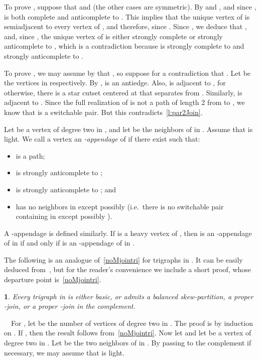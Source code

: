 \documentclass[11 pt] {article}
\newcommand\blackslug{\hbox{\hskip 1pt \vrule width 4pt height 8pt depth 1.5pt
        \hskip 1pt}}
\newcommand\bbox{\hfill \quad \blackslug \medbreak}
\newtheorem{theorem}{}[section]
\newcounter{claim}
\newcommand{\Proof}{\setcounter{claim}{0}\noindent{\bf Proof.}\ \ }
\begin{document}
To prove , suppose that  and  (the
other cases are symmetric). By  and , and since
,  is both complete and anticomplete to
. This implies that the unique vertex of  is semiadjacent
to every vertex of , and therefore, since . Since , we deduce that , and,
since , the unique vertex of  is either
strongly complete or strongly anticomplete to , which is a contradiction because  is strongly complete to
 and strongly anticomplete to .

To prove , we may assume by  that ,
so suppose for a contradiction that .  Let  be the vertices in  respectively.  By , 
is an antiedge.  Also,  is adjacent to , for otherwise, there is
a star cutset centered at  that separates  from . Similarly,
 is adjacent to .  Since the full realization of  is not
a path of length 2 from  to , we know that  is a switchable
pair.  But this contradicts~\ref{l:par2Join}.
\bbox



Let  be a vertex of degree two in , and let  be the
neighbors of  in . Assume that  is light. We call a
vertex  an {\em -appendage} of
 if there exist  such that:
\begin{itemize}
\item  is a path;
\item  is strongly anticomplete to ;
\item  is strongly anticomplete to ; and
\item  has no neighbors in  except possibly  (i.e.\
  there is no switchable pair containing  in  except possibly
  ).
\end{itemize}

A -appendage is defined similarly. If  is a heavy vertex of ,
then  is an -appendage of  in  if and only if  is an
-appendage of  in .

The following is an analogue of~\ref{noMjointri} for trigraphs in .  It can 
be easily deduced from~\cite{thesis}, but for the reader's convenience we include a
short proof, whose departure point is~\ref{noMjointri}.

\begin{theorem}
  \label{structure}
  Every trigraph in  is either basic, or admits a
  balanced skew-partition, a proper -join, or a proper -join
  in the complement.
\end{theorem}

\Proof For , let  be the number of
vertices of degree two in . The proof is by induction on
. If , then the result follows
from~\ref{noMjointri}. Now let  and let  be a
vertex of degree two in . Let  be the two neighbors of
 in . By passing to the complement if necessary, we may
assume that  is light.
\end{document}
